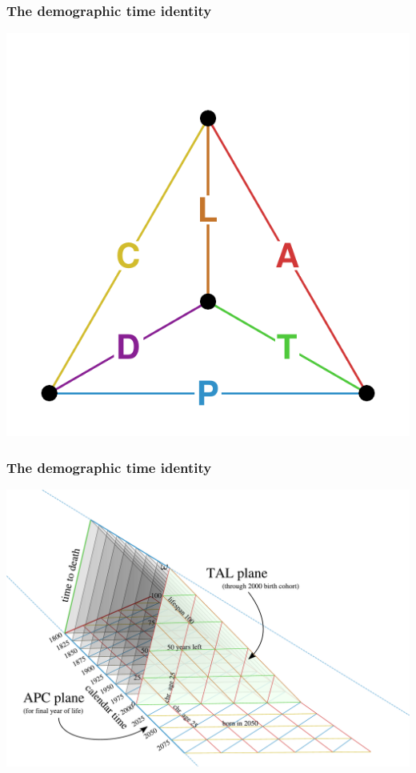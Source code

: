 \documentclass[20pt]{beamer}
\begin{document}

\begin{frame}
\frametitle{The demographic time identity}
\vspace{-4em}
\begin{center}
\includegraphics[scale=1.7]{Figures/TetraHedronEdgesOnly.pdf}
\end{center}
\end{frame}


\begin{frame}
\frametitle{The demographic time identity}
\vspace{-4em}
\begin{center}
\includegraphics[scale=.8]{Figures/TALisomarkedup2PAA.pdf}
\end{center}
\end{frame}
\end{document}
